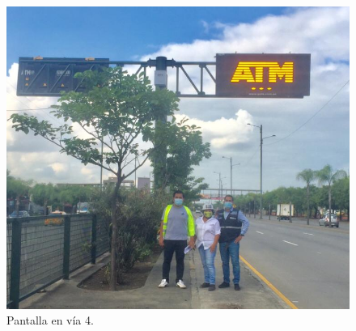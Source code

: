\begin{figure}[htpb]
	\centering
	\includegraphics[scale=0.6]{Figures/calle4.jpg} 
	\caption{Pantalla en vía 4.}
	\label{fig: calle4}
\end{figure}
